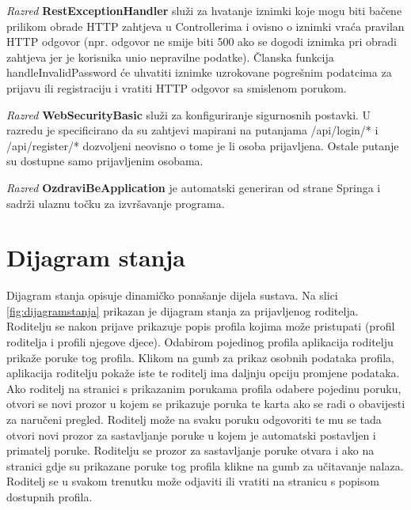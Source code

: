 			\textit{Razred }\textbf{RestExceptionHandler}
			služi za hvatanje iznimki koje mogu biti bačene prilikom obrade HTTP zahtjeva u Controllerima i ovisno o iznimki
			vraća pravilan HTTP odgovor (npr. odgovor ne smije biti 500 ako se dogodi iznimka pri obradi zahtjeva jer je korisnika
			unio nepravilne podatke). Članska funkcija handleInvalidPassword će uhvatiti iznimke uzrokovane
			pogrešnim podatcima za prijavu ili registraciju i vratiti HTTP odgovor sa smislenom porukom.
			
			\textit{Razred }\textbf{WebSecurityBasic}
			služi za konfiguriranje sigurnosnih postavki. U razredu je specificirano da su zahtjevi mapirani na putanjama /api/login/* i /api/register/* dozvoljeni neovisno o tome je li osoba prijavljena. Ostale putanje su dostupne samo prijavljenim osobama.
			
			\textit{Razred }\textbf{OzdraviBeApplication}
			je automatski generiran od strane Springa i sadrži ulaznu točku za izvršavanje programa.
			
			\eject
		
		\section{Dijagram stanja}
			
			
			Dijagram stanja opisuje dinamičko ponašanje dijela sustava. Na slici \ref{fig:dijagramstanja} prikazan je dijagram stanja za prijavljenog roditelja. Roditelju se nakon prijave prikazuje popis profila kojima može pristupati (profil roditelja i profili njegove djece). Odabirom pojedinog profila aplikacija roditelju prikaže poruke tog profila. Klikom na gumb za prikaz osobnih podataka profila, aplikacija roditelju pokaže iste te roditelj ima daljnju opciju promjene podataka. Ako roditelj na stranici s prikazanim porukama profila odabere pojedinu poruku, otvori se novi prozor u kojem se prikazuje poruka te karta ako se radi o obavijesti za naručeni pregled. Roditelj može na svaku poruku odgovoriti te mu se tada otvori novi prozor za sastavljanje poruke u kojem je automatski postavljen i primatelj poruke. Roditelju se prozor za sastavljanje poruke otvara i ako na stranici gdje su prikazane poruke tog profila klikne na gumb za učitavanje nalaza. Roditelj se u svakom trenutku može odjaviti ili vratiti na stranicu s popisom dostupnih profila.
			
